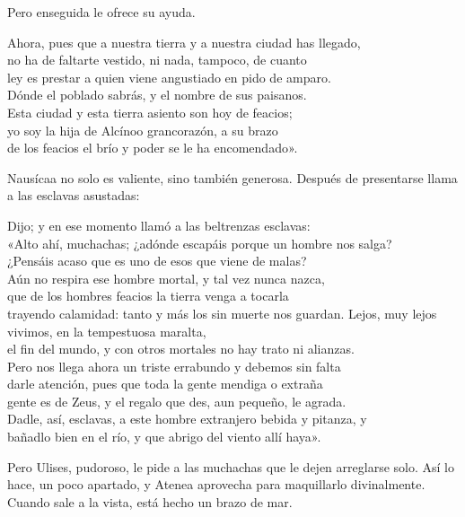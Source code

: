 Pero enseguida le ofrece su ayuda.

\begin{versocita}
Ahora, pues que a nuestra tierra y a nuestra ciudad has llegado,\\
no ha de faltarte vestido, ni nada, tampoco, de cuanto\\
ley es prestar a quien viene angustiado en pido de amparo.\\
Dónde el poblado sabrás, y el nombre de sus paisanos.\\
Esta ciudad y esta tierra asiento son hoy de feacios;\\
yo soy la hija de Alcínoo grancorazón, a su brazo\\
de los feacios el brío y poder se le ha encomendado».
\end{versocita}

Nausícaa no solo es valiente, sino también generosa. Después de presentarse llama a las esclavas asustadas:

\begin{versocita}
Dijo; y en ese momento llamó a las beltrenzas esclavas:\\
«Alto ahí, muchachas; ¿adónde escapáis porque un hombre nos salga?\\
¿Pensáis acaso que es uno de esos que viene de malas?\\
Aún no respira ese hombre mortal, y tal vez nunca nazca,\\
que de los hombres feacios la tierra venga a tocarla\\
trayendo calamidad: tanto y más los sin muerte nos guardan.
\stanzabreak
Lejos, muy lejos vivimos, en la tempestuosa maralta,\\
el fin del mundo, y con otros mortales no hay trato ni alianzas.\\
Pero nos llega ahora un triste errabundo y debemos sin falta\\
darle atención, pues que toda la gente mendiga o extraña\\
gente es de Zeus, y el regalo que des, aun pequeño, le agrada.\\
Dadle, así, esclavas, a este hombre extranjero bebida y pitanza, y\\
bañadlo bien en el río, y que abrigo del viento allí haya».
\end{versocita}

Pero Ulises, pudoroso, le pide a las muchachas que le dejen arreglarse solo. Así lo hace, un poco apartado, y Atenea aprovecha para maquillarlo divinalmente. Cuando sale a la vista, está hecho un brazo de mar.

